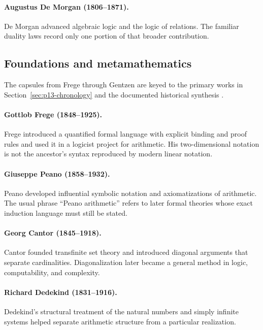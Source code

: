 \paragraph{Augustus De Morgan (1806--1871).}
De Morgan advanced algebraic logic and the logic of relations. The familiar
duality laws record only one portion of that broader contribution.

\subsection*{Foundations and metamathematics}
The capsules from Frege through Gentzen are keyed to the primary works in
Section~\ref{sec:p13-chronology} and the documented historical synthesis
\cite{GrattanGuinness2000}.

\paragraph{Gottlob Frege (1848--1925).}
Frege introduced a quantified formal language with explicit binding and proof
rules and used it in a logicist project for arithmetic. His two-dimensional
notation is not the ancestor's syntax reproduced by modern linear notation.

\paragraph{Giuseppe Peano (1858--1932).}
Peano developed influential symbolic notation and axiomatizations of
arithmetic. The usual phrase ``Peano arithmetic'' refers to later formal
theories whose exact induction language must still be stated.

\paragraph{Georg Cantor (1845--1918).}
Cantor founded transfinite set theory and introduced diagonal arguments that
separate cardinalities. Diagonalization later became a general method in
logic, computability, and complexity.

\paragraph{Richard Dedekind (1831--1916).}
Dedekind's structural treatment of the natural numbers and simply infinite
systems helped separate arithmetic structure from a particular realization.

